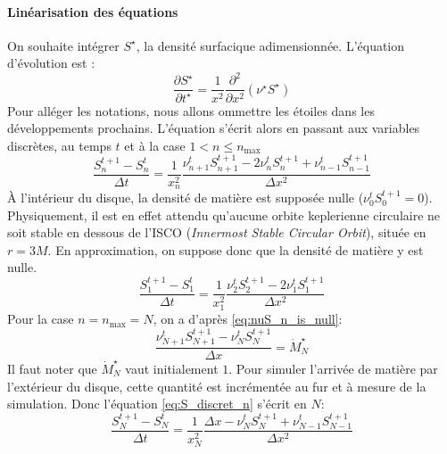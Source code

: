 \paragraph{Linéarisation des équations}

On souhaite intégrer $S^\star$, la densité surfacique adimensionnée. L'équation d'évolution est :
\begin{equation}
  \frac{\partial S^\star}{\partial t^\star} = \frac{1}{x^2}\frac{\partial^2}{\partial x^2}\left(\nu^\star S^\star\right)
\end{equation}
Pour alléger les notations, nous allons ommettre les étoiles dans les développements prochains. L'équation s'écrit alors en passant aux variables discrètes, au temps $t$ et à la case $1<n\leq n_\textrm{max}$
\begin{equation}
  \label{eq:S_discret_n}
  \frac{S^{t+1}_n - S^t_n}{\Delta t} = \frac{1}{x_n^2}\frac{\nu^t_{n+1}S^{t+1}_{n+1} - 2 \nu^t_nS^{t+1}_n + \nu^t_{n-1}S^{t+1}_{n-1}}{\Delta x^2}
\end{equation}
À l'intérieur du disque, la densité de matière est supposée nulle ($\nu^t_{0}S^{t+1}_{0} = 0$). Physiquement, il est en effet attendu qu'aucune orbite keplerienne circulaire ne soit stable en dessous de l'ISCO (\emph{\emph{I}nnermost \emph{S}table \emph{C}ircular \emph{O}rbit}), située en $r = 3M$. En approximation, on suppose donc que la densité de matière y est nulle.
\begin{equation}
  \label{eq:S_discret_1}
  \frac{S^{t+1}_1 - S^t_1}{\Delta t} = \frac{1}{x_1^2}\frac{\nu^t_{2}S^{t+1}_{2} - 2 \nu^t_1S^{t+1}_1}{\Delta x^2}
\end{equation}
Pour la case $n = n_\textrm{max} = N$, on a d'après \eqref{eq:nuS_n_is_null}:
\begin{equation}
  \frac{\nu^{t}_{N+1}S^{t+1}_{N+1} - \nu^{t}_NS^{t+1}_N}{\Delta x} = \dot{M}^\star_N
\end{equation}
Il faut noter que $\dot{M}^\star_N$ vaut initialement $1$. Pour simuler l'arrivée de matière par l'extérieur du disque, cette quantité est incrémentée au fur et à mesure de la simulation.
Donc l'équation \eqref{eq:S_discret_n} s'écrit en $N$:
\begin{equation}
  \label{eq:S_discret_N}
  \frac{S^{t+1}_N - S^t_N}{\Delta t} = \frac{1}{x_N^2}\frac{\Delta x - \nu^{t}_NS^{t+1}_N + \nu^{t}_{N-1}S^{t+1}_{N-1}}{\Delta x^2}
\end{equation}

